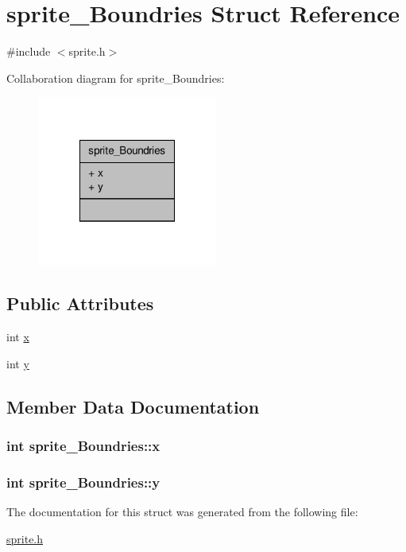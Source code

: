 \hypertarget{structsprite__Boundries}{\section{sprite\-\_\-\-Boundries Struct Reference}
\label{structsprite__Boundries}
}


{\ttfamily \#include $<$sprite.\-h$>$}



Collaboration diagram for sprite\-\_\-\-Boundries\-:\nopagebreak
\begin{figure}[H]
\begin{center}
\leavevmode
\includegraphics[width=168pt]{structsprite__Boundries__coll__graph}
\end{center}
\end{figure}
\subsection*{Public Attributes}
\begin{DoxyCompactItemize}
\item 
int \hyperlink{structsprite__Boundries_aeab703617b349cb325b3d1a7527529d9}{x}
\item 
int \hyperlink{structsprite__Boundries_a23a22dcb45309e748446cb4e7a7c11f3}{y}
\end{DoxyCompactItemize}


\subsection{Member Data Documentation}
\hypertarget{structsprite__Boundries_aeab703617b349cb325b3d1a7527529d9}{
\subsubsection[{x}]{\setlength{\rightskip}{0pt plus 5cm}int sprite\-\_\-\-Boundries\-::x}}\label{structsprite__Boundries_aeab703617b349cb325b3d1a7527529d9}
\hypertarget{structsprite__Boundries_a23a22dcb45309e748446cb4e7a7c11f3}{
\subsubsection[{y}]{\setlength{\rightskip}{0pt plus 5cm}int sprite\-\_\-\-Boundries\-::y}}\label{structsprite__Boundries_a23a22dcb45309e748446cb4e7a7c11f3}


The documentation for this struct was generated from the following file\-:\begin{DoxyCompactItemize}
\item 
\hyperlink{sprite_8h}{sprite.\-h}\end{DoxyCompactItemize}
